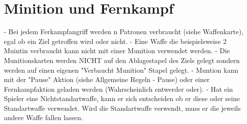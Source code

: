 \section{Minition und Fernkampf}

- Bei jedem Ferkampfangriff werden n Patronen verbraucht (siehe Waffenkarte), egal ob ein Ziel getroffen
  wird oder nicht.
- Eine Waffe die beispielsweise 2 Muintin verbraucht kann nicht mit einer Munition verwendet werden.
- Die Munitionskarten werden NICHT auf den Ablagestapel des Ziels gelegt sondern werden auf einen
  eigenen "Verbaucht Munition" Stapel gelegt.
- Muntion kann mit der "Pause" Aktion (siehe Allgemeine Regeln - Pause) oder einer Fernkampfaktion
  geladen werden (Wahrscheinlich entwerder oder).
- Hat ein Spieler eine Nichtstandartwaffe, kann er sich entscheiden ob er diese oder seine Standartwaffe
  verwendet. Wird die Standartwaffe verwendt, muss er die jeweils andere Waffe fallen lassen.